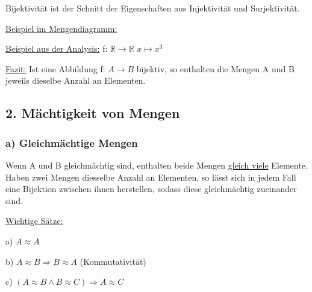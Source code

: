 \documentclass[12pt]{article}
\begin{document}
		Bijektivität ist der Schnitt der Eigenschaften aus Injektivität und Surjektivität.
		
		\underline{Beispiel im Mengendiagramm:}
		
		
		\underline{Beispiel aus der Analysis:} \hspace*{3mm} f: $\mathbb{R} \rightarrow \mathbb{R}$ \hspace*{2mm} $x \mapsto x^3$
		
		\underline{Fazit:} Ist eine Abbildung f: $A \rightarrow B$ bijektiv, so enthalten die Mengen A und B jeweils dieselbe Anzahl 
		an Elementen.
		
		\subsection*{2. Mächtigkeit von Mengen}
		\subsubsection*{a) Gleichmächtige Mengen}
		
		
		\bigskip
		
		Wenn A und B gleichmächtig sind, enthalten beide Mengen \underline{gleich viele} Elemente.
		Haben zwei Mengen diesselbe Anzahl an Elementen, so lässt sich in jedem Fall eine Bijektion zwischen ihnen herstellen,
		sodass diese gleichmächtig zueinander sind.
		
		\underline{Wichtige Sätze:}
		
		{
			\begin{singlespace}
			a) $A \approx A$
			
			b) $A \approx B \Rightarrow B \approx A$ \hspace*{3mm} (Kommutativität)
			
			c) $(A \approx B \land B \approx C) \Rightarrow A \approx C$
			\end{singlespace}
		}
		
\end{document}
